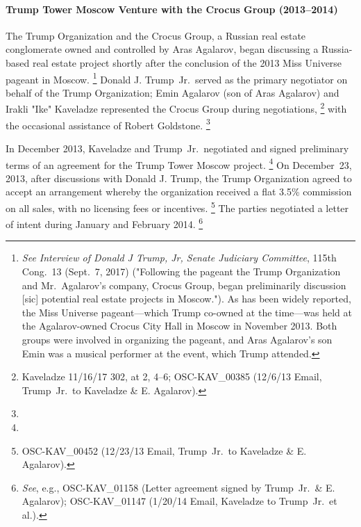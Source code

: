 \paragraph{Trump Tower Moscow Venture with the Crocus Group (2013--2014)}

The Trump Organization and the Crocus Group, a Russian real estate conglomerate owned and controlled by Aras Agalarov, began discussing a Russia-based real estate project shortly after the conclusion of the 2013 Miss Universe pageant in Moscow.%
\footnote{\textit{See Interview of Donald J Trump, Jr, Senate Judiciary Committee}, 115th Cong.~13 (Sept.~7, 2017) ("Following the pageant the Trump Organization and Mr.~Agalarov's company, Crocus Group, began preliminarily discussion [sic] potential real estate projects in Moscow.").
As has been widely reported, the Miss Universe pageant---which Trump co-owned at the time---was held at the Agalarov-owned Crocus City Hall in Moscow in November
2013. Both groups were involved in organizing the pageant, and Aras Agalarov's son Emin was a musical performer at the event, which Trump attended.}
Donald J. Trump~Jr.\ served as the primary negotiator on behalf of the Trump Organization; Emin Agalarov (son of Aras Agalarov) and Irakli "Ike" Kaveladze represented the Crocus Group during negotiations,%
\footnote{Kaveladze 11/16/17 302, at 2, 4--6;  OSC-KAV\_00385 (12/6/13 Email, Trump~Jr.\ to Kaveladze \& E. Agalarov).}
with the occasional assistance of Robert Goldstone.%
\footnote{}

In December 2013, Kaveladze and Trump~Jr.\ negotiated and signed preliminary terms of an agreement for the Trump Tower Moscow project.%
\footnote{}
On December~23, 2013, after discussions with Donald J. Trump, the Trump Organization agreed to accept an arrangement whereby the organization received a flat 3.5\% commission on all sales, with no licensing fees or incentives.%
\footnote{OSC-KAV\_00452 (12/23/13 Email, Trump~Jr.\ to Kaveladze \& E. Agalarov).}
The parties negotiated a letter of intent during January and February 2014.%
\footnote{\textit{See}, e.g., OSC-KAV\_01158 (Letter agreement signed by Trump~Jr.\ \& E. Agalarov); OSC-KAV\_01147 (1/20/14 Email, Kaveladze to Trump~Jr.\ et al.).}

